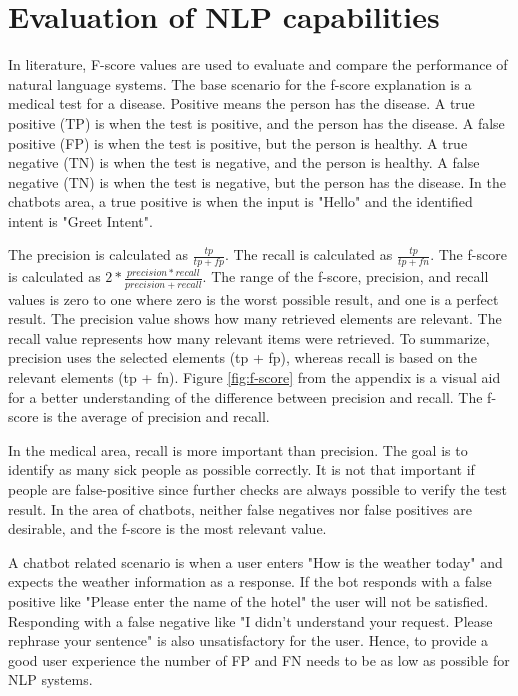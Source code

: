 \section{Evaluation of NLP capabilities}
In literature, F-score values are used to evaluate and compare the performance of natural language systems.
The base scenario for the f-score explanation is a medical test for a disease.
Positive means the person has the disease.
A true positive (TP) is when the test is positive, and the person has the disease.
A false positive (FP) is when the test is positive, but the person is healthy.
A true negative (TN) is when the test is negative, and the person is healthy.
A false negative (TN) is when the test is negative, but the person has the disease.
In the chatbots area, a true positive is when the input is "Hello" and the identified intent is "Greet Intent".

The precision is calculated as $\frac{tp}{tp + fp}$.
The recall is calculated as $\frac{tp}{tp + fn}$.
The f-score is calculated as $2 * \frac{precision * recall}{precision + recall}$.
The range of the f-score, precision, and recall values is zero to one where zero is the worst possible result, and one is a perfect result.
The precision value shows how many retrieved elements are relevant.
The recall value represents how many relevant items were retrieved.
To summarize, precision uses the selected elements (tp + fp), whereas recall is based on the relevant elements (tp + fn).
Figure \ref{fig:f-score} from the appendix is a visual aid for a better understanding of the difference between precision and recall.
The f-score is the average of precision and recall.

In the medical area, recall is more important than precision.
The goal is to identify as many sick people as possible correctly.
It is not that important if people are false-positive since further checks are always possible to verify the test result.
In the area of chatbots, neither false negatives nor false positives are desirable, and the f-score is the most relevant value.

A chatbot related scenario is when a user enters "How is the weather today" and expects the weather information as a response.
If the bot responds with a false positive like "Please enter the name of the hotel" the user will not be satisfied.
Responding with a false negative like "I didn't understand your request. Please rephrase your sentence" is also unsatisfactory for the user.
Hence, to provide a good user experience the number of FP and FN needs to be as low as possible for NLP systems.

